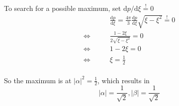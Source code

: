 \documentclass[a4paper,german,12pt,smallheadings]{scrartcl}
\begin{document}
\begin{enumerate}[a)]
    To search for a possible maximum, set $\text{d}p / \text{d} \xi \overset{!}{=} 0$
    \begin{align*}
      &\frac{\text{d}p}{\text{d} \xi} = \frac{4 \pi}{3} \frac{\text{d}p}{\text{d} \xi} \sqrt{\xi - \xi^2} \overset{!}{=} 0 \\
      \Leftrightarrow\qquad
      &\frac{1 - 2 \xi}{2\sqrt{\xi - \xi^2}} = 0 \\
      \Leftrightarrow\qquad
      &1 - 2 \xi = 0 \\
      \Leftrightarrow\qquad
      &\xi = \frac{1}{2} \\
    \end{align*}

    So the maximum is at $|\alpha|^2 = \frac{1}{2}$, which results in
    \begin{equation*}
      |\alpha| = \frac{1}{\sqrt{2}}, |\beta| = \frac{1}{\sqrt{2}}
    \end{equation*}


\end{enumerate}
\end{document}
